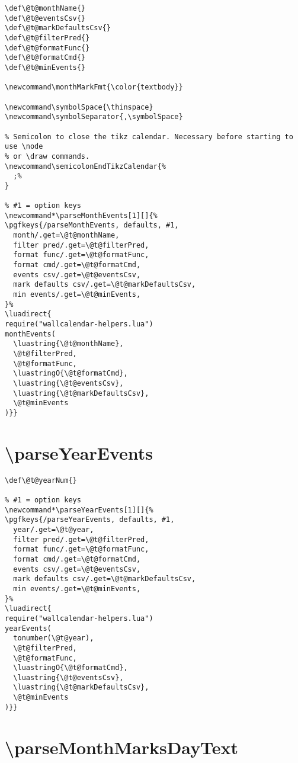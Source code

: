 \documentclass[11pt,oneside]{memoir-article}
\begin{document}
\begin{verbatim}
\def\@t@monthName{}
\def\@t@eventsCsv{}
\def\@t@markDefaultsCsv{}
\def\@t@filterPred{}
\def\@t@formatFunc{}
\def\@t@formatCmd{}
\def\@t@minEvents{}

\newcommand\monthMarkFmt{\color{textbody}}

\newcommand\symbolSpace{\thinspace}
\newcommand\symbolSeparator{,\symbolSpace}

% Semicolon to close the tikz calendar. Necessary before starting to use \node
% or \draw commands.
\newcommand\semicolonEndTikzCalendar{%
  ;%
}

% #1 = option keys
\newcommand*\parseMonthEvents[1][]{%
\pgfkeys{/parseMonthEvents, defaults, #1,
  month/.get=\@t@monthName,
  filter pred/.get=\@t@filterPred,
  format func/.get=\@t@formatFunc,
  format cmd/.get=\@t@formatCmd,
  events csv/.get=\@t@eventsCsv,
  mark defaults csv/.get=\@t@markDefaultsCsv,
  min events/.get=\@t@minEvents,
}%
\luadirect{
require("wallcalendar-helpers.lua")
monthEvents(
  \luastring{\@t@monthName},
  \@t@filterPred,
  \@t@formatFunc,
  \luastringO{\@t@formatCmd},
  \luastring{\@t@eventsCsv},
  \luastring{\@t@markDefaultsCsv},
  \@t@minEvents
)}}
\end{verbatim}

\section{\textbackslash parseYearEvents}
\label{sec:orge5a5f7a}

\begin{verbatim}
\def\@t@yearNum{}

% #1 = option keys
\newcommand*\parseYearEvents[1][]{%
\pgfkeys{/parseYearEvents, defaults, #1,
  year/.get=\@t@year,
  filter pred/.get=\@t@filterPred,
  format func/.get=\@t@formatFunc,
  format cmd/.get=\@t@formatCmd,
  events csv/.get=\@t@eventsCsv,
  mark defaults csv/.get=\@t@markDefaultsCsv,
  min events/.get=\@t@minEvents,
}%
\luadirect{
require("wallcalendar-helpers.lua")
yearEvents(
  tonumber(\@t@year),
  \@t@filterPred,
  \@t@formatFunc,
  \luastringO{\@t@formatCmd},
  \luastring{\@t@eventsCsv},
  \luastring{\@t@markDefaultsCsv},
  \@t@minEvents
)}}
\end{verbatim}

\section{\textbackslash parseMonthMarksDayText}
\label{sec:orgf8f32b8}
\end{document}
